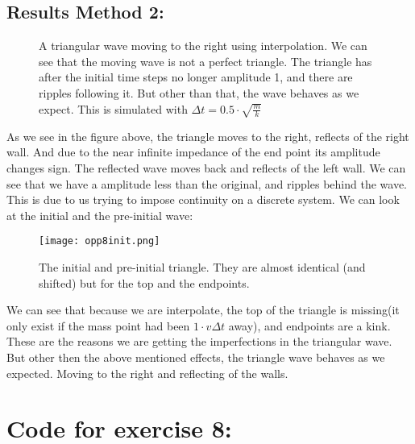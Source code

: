 \documentclass[a4paper,norsk, 10pt]{article}
\begin{document}
\subsection*{Results Method 2:}


\begin{figure}[H]
\captionsetup[subfigure]{position=b}
\centering
{}
\par
{}
\caption{A triangular wave moving to the right using interpolation. We can see that the moving wave is not a perfect triangle. The triangle has after the initial time steps no longer amplitude 1, and there are ripples following it. But other than that, the wave behaves as we expect. This is simulated with $\Delta t = 0.5\cdot \sqrt{\frac{m}{k}}$}
\end{figure}

As we see in the figure above, the triangle moves to the right, reflects of the right wall. And due to the near infinite impedance of the end point its amplitude changes sign. The reflected wave moves back and reflects of the left wall. We can see that we have a amplitude less than the original, and ripples behind the wave. This is due to us trying to impose continuity on a discrete system. We can look at the initial and the pre-initial wave:

\begin{figure}[H]
\centering
\texttt{[image: opp8init.png]}
\caption{The initial and pre-initial triangle. They are almost identical (and shifted) but for the top and the endpoints.}
\end{figure}

We can see that because we are interpolate, the top of the triangle is missing(it only exist if the mass point had been $1\cdot v\Delta t$ away), and endpoints are a kink. These are the reasons we are getting the imperfections in the triangular wave.\\

But other then the above mentioned effects, the triangle wave behaves as we expected. Moving to the right and reflecting of the walls.









\appendix

\section{Code for exercise 8:}

\end{document}
